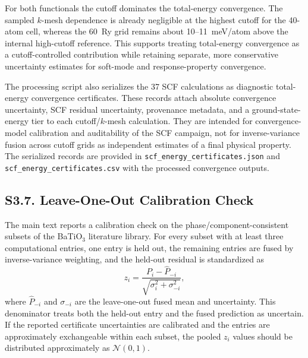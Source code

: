 ﻿\documentclass[prb,onecolumn,superscriptaddress,amsmath,amssymb,longbibliography]{revtex4-2}
\begin{document}
For both functionals the cutoff dominates the total-energy convergence. The
sampled $k$-mesh dependence is already negligible at the highest cutoff for
the 40-atom cell, whereas the 60~Ry grid remains about 10--11~meV/atom above
the internal high-cutoff reference. This supports treating total-energy
convergence as a cutoff-controlled contribution while retaining separate,
more conservative uncertainty estimates for soft-mode and response-property
convergence.

The processing script also serializes the 37 SCF calculations as diagnostic
total-energy convergence certificates. These records attach absolute
convergence uncertainty, SCF residual uncertainty, provenance metadata, and a
ground-state-energy tier to each cutoff/$k$-mesh calculation. They are intended
for convergence-model calibration and auditability of the SCF campaign, not for
inverse-variance fusion across cutoff grids as independent estimates of a final
physical property. The serialized records are provided in
\texttt{scf\_energy\_certificates.json} and
\texttt{scf\_energy\_certificates.csv} with the processed convergence outputs.

\subsection{S3.7. Leave-One-Out Calibration Check}

The main text reports a calibration check on the phase/component-consistent
subsets of the BaTiO$_3$ literature library. For every subset with at least
three computational entries, one entry is held out, the remaining entries are
fused by inverse-variance weighting, and the held-out residual is standardized
as
\begin{equation}
    z_i =
    \frac{P_i - \hat{P}_{-i}}
    {\sqrt{\sigma_i^2 + \sigma_{-i}^2}},
\end{equation}
where $\hat{P}_{-i}$ and $\sigma_{-i}$ are the leave-one-out fused mean and
uncertainty. This denominator treats both the held-out entry and the fused
prediction as uncertain. If the reported certificate uncertainties are
calibrated and the entries are approximately exchangeable within each subset,
the pooled $z_i$ values should be distributed approximately as
$\mathcal{N}(0,1)$.
\end{document}
